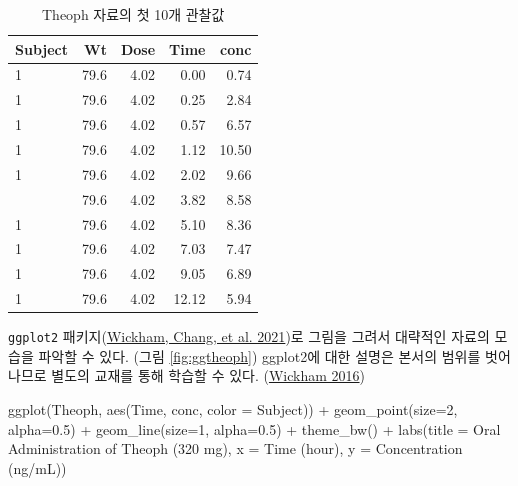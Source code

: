 \documentclass[
  11pt,
  krantz2, a4paper, twoside]{krantz}
\newenvironment{Shaded}{\begin{snugshade}}{\end{snugshade}}
\newcommand{\AttributeTok}[1]{\textcolor[rgb]{0.77,0.63,0.00}{#1}}
\newcommand{\DecValTok}[1]{\textcolor[rgb]{0.00,0.00,0.81}{#1}}
\newcommand{\FloatTok}[1]{\textcolor[rgb]{0.00,0.00,0.81}{#1}}
\newcommand{\FunctionTok}[1]{\textcolor[rgb]{0.00,0.00,0.00}{#1}}
\newcommand{\NormalTok}[1]{#1}
\newcommand{\SpecialCharTok}[1]{\textcolor[rgb]{0.00,0.00,0.00}{#1}}
\newcommand{\StringTok}[1]{\textcolor[rgb]{0.31,0.60,0.02}{#1}}
\theoremstyle{definition}
\theoremstyle{definition}
\theoremstyle{definition}
\theoremstyle{definition}
\theoremstyle{remark}
\begin{document}
\begin{table}

\caption{\label{tab:head}Theoph 자료의 첫 10개 관찰값}
\centering
\begin{tabular}[t]{lrrrr}
\toprule
Subject & Wt & Dose & Time & conc\\
\midrule
1 & 79.6 & 4.02 & 0.00 & 0.74\\
1 & 79.6 & 4.02 & 0.25 & 2.84\\
1 & 79.6 & 4.02 & 0.57 & 6.57\\
1 & 79.6 & 4.02 & 1.12 & 10.50\\
1 & 79.6 & 4.02 & 2.02 & 9.66\\
\addlinespace
1 & 79.6 & 4.02 & 3.82 & 8.58\\
1 & 79.6 & 4.02 & 5.10 & 8.36\\
1 & 79.6 & 4.02 & 7.03 & 7.47\\
1 & 79.6 & 4.02 & 9.05 & 6.89\\
1 & 79.6 & 4.02 & 12.12 & 5.94\\
\bottomrule
\end{tabular}
\end{table}

\texttt{ggplot2} 패키지(\protect\hyperlink{ref-R-ggplot2}{Wickham, Chang, et al. 2021})로 그림을 그려서 대략적인 자료의 모습을 파악할 수 있다. (그림 \ref{fig:ggtheoph}) ggplot2에 대한 설명은 본서의 범위를 벗어나므로 별도의 교재를 통해 학습할 수 있다. (\protect\hyperlink{ref-ggplot22016}{Wickham 2016})

\begin{Shaded}
\begin{Highlighting}[]
\FunctionTok{ggplot}\NormalTok{(Theoph, }\FunctionTok{aes}\NormalTok{(Time, conc, }\AttributeTok{color =}\NormalTok{ Subject)) }\SpecialCharTok{+}
  \FunctionTok{geom\_point}\NormalTok{(}\AttributeTok{size=}\DecValTok{2}\NormalTok{, }\AttributeTok{alpha=}\FloatTok{0.5}\NormalTok{) }\SpecialCharTok{+} 
  \FunctionTok{geom\_line}\NormalTok{(}\AttributeTok{size=}\DecValTok{1}\NormalTok{, }\AttributeTok{alpha=}\FloatTok{0.5}\NormalTok{) }\SpecialCharTok{+}
  \FunctionTok{theme\_bw}\NormalTok{() }\SpecialCharTok{+}
  \FunctionTok{labs}\NormalTok{(}\AttributeTok{title =} \StringTok{\textquotesingle{}Oral Administration of Theoph (320 mg)\textquotesingle{}}\NormalTok{,}
       \AttributeTok{x =} \StringTok{\textquotesingle{}Time (hour)\textquotesingle{}}\NormalTok{, }\AttributeTok{y =} \StringTok{\textquotesingle{}Concentration (ng/mL)\textquotesingle{}}\NormalTok{)}
\end{Highlighting}
\end{Shaded}
\end{document}
